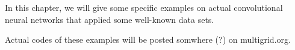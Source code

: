 
In this chapter, we will give some specific examples on actual convolutional neural networks that applied some well-known data sets. 

Actual codes of these examples will be posted somwhere (?) on multigrid.org.



